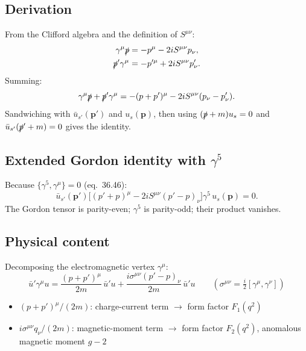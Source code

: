 \subsection{Derivation}

From the Clifford algebra and the definition of $S^{\mu\nu}$:
\begin{align}
  \gamma^\mu\slashed{p} &= -p^\mu - 2iS^{\mu\nu}p_\nu, \\
  \slashed{p}'\gamma^\mu &= -p^{\prime\mu} + 2iS^{\mu\nu}p'_\nu.
\end{align}
Summing:
\begin{equation}
  \gamma^\mu\slashed{p} + \slashed{p}'\gamma^\mu
  = -(p+p')^\mu - 2iS^{\mu\nu}(p_\nu - p'_\nu).
\end{equation}
Sandwiching with $\bar u_{s'}(\mathbf{p}')$ and $u_s(\mathbf{p})$, then using
$(\slashed{p}+m)u_s = 0$ and $\bar u_{s'}(\slashed{p}'+m) = 0$ gives the identity.

\subsection{Extended Gordon identity with \texorpdfstring{$\gamma^5$}{gamma5}}

Because $\{\gamma^5,\gamma^\mu\} = 0$ (eq.~36.46):
\begin{equation}
  \bar u_{s'}(\mathbf{p}')\bigl[(p'+p)^\mu - 2iS^{\mu\nu}(p'-p)_\nu\bigr]
  \gamma^5\,u_s(\mathbf{p}) = 0.
  \tag{38.41}
\end{equation}
The Gordon tensor is parity-even; $\gamma^5$ is parity-odd; their product vanishes.

\subsection{Physical content}

Decomposing the electromagnetic vertex $\gamma^\mu$:
\begin{equation}
  \bar u'\gamma^\mu u
  = \frac{(p+p')^\mu}{2m}\,\bar u'u
  + \frac{i\sigma^{\mu\nu}(p'-p)_\nu}{2m}\,\bar u'u
  \qquad
  (\sigma^{\mu\nu} = \tfrac{i}{2}[\gamma^\mu,\gamma^\nu])
\end{equation}
\begin{itemize}
  \item $(p+p')^\mu/(2m)$: charge-current term $\to$ form factor $F_1(q^2)$
  \item $i\sigma^{\mu\nu}q_\nu/(2m)$: magnetic-moment term $\to$ form factor $F_2(q^2)$, anomalous magnetic moment $g{-}2$
\end{itemize}

